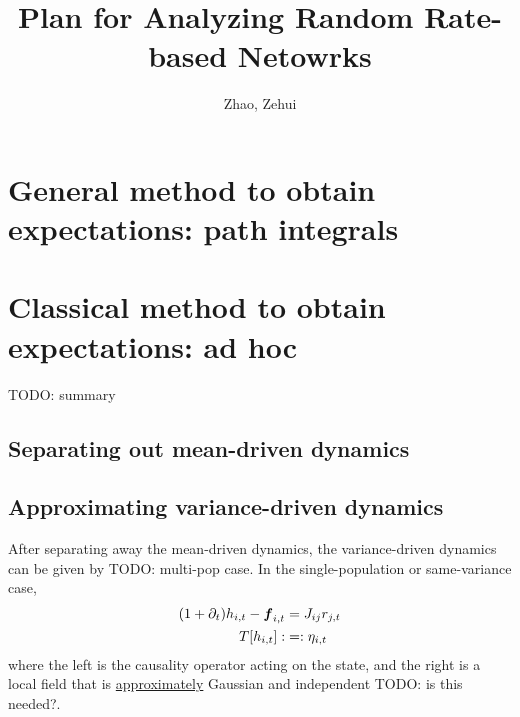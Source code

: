 \documentclass[11pt,openany,oneside]{article} %
\title{\vspace{-2em}Plan for Analyzing Random Rate-based Netowrks}
\author{Zhao, Zehui}
\date{}
\newcommand{\todo}[1]{{\color{red} TODO: #1}}
\begin{document}
\maketitle
\tableofcontents

\section{General method to obtain expectations: path integrals}

\section{Classical method to obtain expectations: ad hoc}
\todo{summary}

\subsection{Separating out mean-driven dynamics}

\subsection{Approximating variance-driven dynamics}
After separating away the mean-driven dynamics, the variance-driven dynamics can be given by
\todo{multi-pop case}.  In the single-population or same-variance case, 
\begin{equation}
  \label{eq:var-dyn}
  \begin{aligned}
      (1+\partial_t)h_{i,t} - \boldsymbol{f}_{i,t} &= J_{ij}r_{j,t}\\
      T\lbrack h_{i,t}\rbrack :&= : \eta_{i,t}
  \end{aligned}
\end{equation}
where the left is the causality operator acting on the state, and the right is a local field that is
\uline{approximately} Gaussian and independent \todo{is this needed?}.
\end{document}
